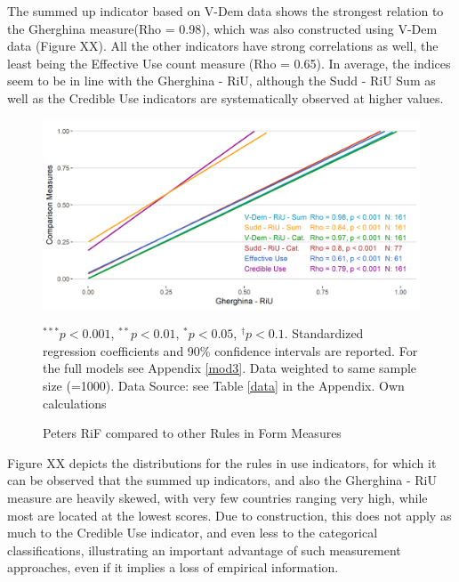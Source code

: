 \documentclass{systats}
\begin{document}
The summed up indicator based on V-Dem data shows the strongest relation to the Gherghina measure(Rho = 0.98), which was also constructed using V-Dem data (Figure XX). All the other indicators have strong correlations as well, the least being the Effective Use count measure (Rho = 0.65). In average, the indices seem to be in line with the Gherghina - RiU, although the  Sudd - RiU Sum as well as the Credible Use indicators are systematically observed at higher values.



\begin{figure}
	\caption{Peters RiF compared to other Rules in Form Measures}
	\label{reg2}
	\includegraphics[width=\textwidth]{images/riu_ghergina.png}
	\flushright
	{\scriptsize $^{***}p<0.001$, $^{**}p<0.01$, $^*p<0.05$, $^{\dagger}p<0.1$. Standardized regression coefficients and 90\% confidence intervals are reported. For the full models see Appendix \ref{mod3}. Data weighted to same sample size (=1000). Data Source: see Table \ref{data} in the Appendix. Own calculations  \par}
\end{figure}

Figure XX depicts the distributions for the rules in use indicators, for which it can be observed that the summed up indicators, and also the Gherghina - RiU measure are heavily skewed, with very few countries ranging very high, while most are located at the lowest scores. Due to  construction, this does not apply as much to the Credible Use indicator, and even less to the categorical classifications, illustrating an important advantage of such measurement approaches, even if it implies a loss of empirical information. 
\end{document}
